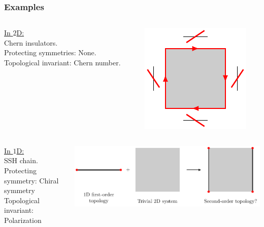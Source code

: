 \documentclass{beamer}
\renewcommand{\(}{\left(}
\renewcommand{\)}{\right)}
\renewcommand{\[}{\left[}
\renewcommand{\]}{\right]}
\begin{document}
\begin{frame}
    \frametitle{Examples}
    \begin{columns}
        \begin{column}{0.6\textwidth}
            \underline{In $2$D:}\\
            Chern insulators. \\
            Protecting symmetries: None. \\
            Topological invariant: Chern number.
        \end{column}
        \begin{column}{0.4\textwidth}
            \begin{center}
                \includegraphics[valign=c]{first_order_boundary.pdf} 
            \end{center}
        \end{column}
    \end{columns}
    \pause
    \begin{columns}
        \begin{column}{0.6\textwidth}
            \underline{In $1$D:}\\
            SSH chain. \\
            Protecting symmetry: Chiral symmetry\\
            Topological invariant: Polarization 
        \end{column}

        \begin{column}{0.4\textwidth}
            \begin{center}
                \includegraphics[scale=0.88, trim = 0 50 265 10, clip, valign=c]{cheap_corner.pdf}
            \end{center}
        \end{column}
    \end{columns}


\end{frame}
\end{document}
